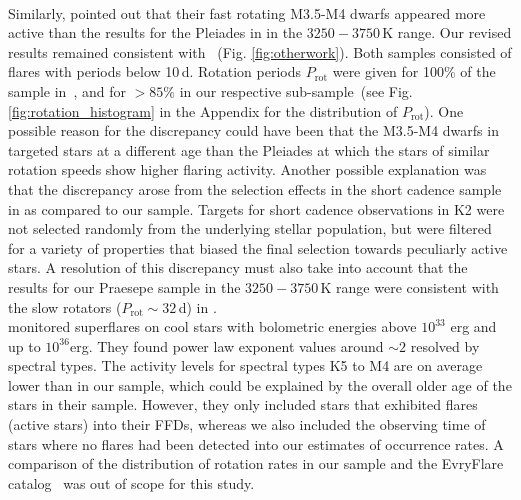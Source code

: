 \documentclass{aa}
\begin{document}
\\
Similarly, \citet{raetz2020} pointed out that their fast rotating M3.5-M4 dwarfs appeared more active than the results for the Pleiades in \citet{ilin_flares_2019} in the $3250-3750\,$K range. Our revised results remained consistent with \citet{ilin_flares_2019}~(Fig. \ref{fig:otherwork}). Both samples consisted of flares with periods below 10\,d. Rotation periods $P_\mathrm{rot}$ were given for 100\% of the sample in~\cite{raetz2020}, and for $>85\%$ in our respective sub-sample~(see Fig. \ref{fig:rotation_histogram} in the Appendix for the distribution of $P_\mathrm{rot}$). One possible reason for the discrepancy could have been that the M3.5-M4 dwarfs in \citet{raetz2020} targeted stars at a different age than the Pleiades at which the stars of similar rotation speeds show higher flaring activity. Another possible explanation was that the discrepancy arose from the selection effects in the short cadence sample in \citet{raetz2020} as compared to our sample. Targets for short cadence observations in K2 were not selected randomly from the underlying stellar population, but were filtered for a variety of properties that biased the final selection towards peculiarly active stars. A resolution of this discrepancy must also take into account that the results for our Praesepe sample in the  $3250-3750\,$K range were consistent with the slow rotators ($P_\mathrm{rot}\sim32\,$d) in \citet{raetz2020}. 
\\
\citet{howard2019} monitored superflares on cool stars with bolometric energies above $10^{33}$ erg and up to $10^{36}$erg. They found power law exponent values around $\sim 2$ resolved by spectral types. The activity levels for spectral types K5 to M4 are on average lower than in our sample, which could be explained by the overall older age of the stars in their sample. However, they only included stars that exhibited flares (active stars) into their FFDs, whereas we also included the observing time of stars where no flares had been detected into our estimates of occurrence rates. A comparison of the distribution of rotation rates in our sample and the EvryFlare catalog~\citep{howard_evryflare2arxiv_2019} was out of scope for this study.
\end{document}
